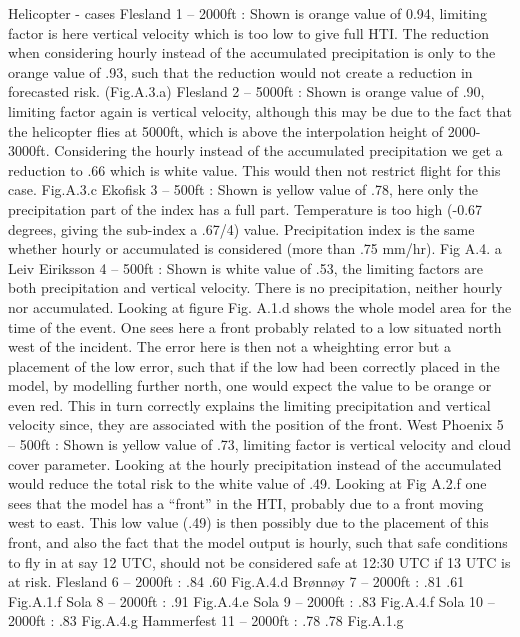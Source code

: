 Helicopter - cases
Flesland 1 – 2000ft : Shown is orange value of 0.94, limiting factor is here vertical velocity which is too low to give full HTI. The reduction when considering hourly instead of the accumulated precipitation is only to the orange value of .93, such that the reduction would not create a reduction in forecasted risk.  (Fig.A.3.a)
Flesland 2 – 5000ft : Shown is orange value of .90, limiting factor again is vertical velocity, although this may be due to the fact that the helicopter flies at 5000ft, which is above the interpolation height of 2000-3000ft. Considering the hourly instead of the accumulated precipitation we get a reduction to  .66 which is white value. This would then not restrict flight for this case. Fig.A.3.c
Ekofisk 3 – 500ft : Shown is yellow value of  .78, here only the precipitation part of the index has a full part.  Temperature is too high (-0.67 degrees, giving the sub-index a .67/4) value. Precipitation index is the same whether hourly or accumulated is considered (more than .75 mm/hr).  Fig A.4. a
Leiv Eiriksson 4 – 500ft : Shown is white value of .53, the limiting factors are both precipitation and vertical velocity. There is no precipitation, neither hourly nor accumulated.  Looking at figure Fig. A.1.d shows the whole model area for the time of the event. One sees here a front probably related to a low situated north west of the incident. The error here is then not a wheighting error but a placement of the low error, such that if the low had been correctly placed in the model, by modelling further north, one would expect the value to be orange or even red. This in turn correctly explains the limiting precipitation and vertical velocity since, they are associated with the position of the front.
West Phoenix 5 – 500ft : Shown is yellow value of .73, limiting factor is vertical velocity and cloud cover parameter. Looking at the hourly precipitation instead of the accumulated would reduce the total risk to the white value of .49. Looking at Fig A.2.f one sees that the model has a “front” in the HTI, probably due to a front moving west to east. This low value (.49) is then possibly due to the placement of this front, and also the fact that the model output is hourly, such that safe conditions to fly in at say 12 UTC, should not be considered safe at 12:30 UTC if 13 UTC is at risk.
Flesland 6 – 2000ft : .84 .60 Fig.A.4.d 
Brønnøy 7 – 2000ft :  .81 .61 Fig.A.1.f
Sola 8 – 2000ft : .91 Fig.A.4.e
Sola 9 – 2000ft : .83 Fig.A.4.f
Sola 10 – 2000ft : .83 Fig.A.4.g
Hammerfest 11 – 2000ft :  .78 .78 Fig.A.1.g




